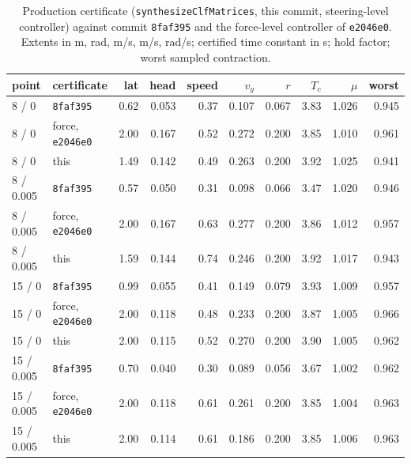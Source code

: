 \documentclass[11pt]{article}
\begin{document}
\begin{table}
\centering\small
\caption{Production certificate (\texttt{synthesizeClfMatrices}, this
commit, steering-level controller) against commit \texttt{8faf395} and the
force-level controller of \texttt{e2046e0}. Extents in m, rad, m/s, m/s,
rad/s; certified time constant in s; hold factor; worst sampled contraction.}
\label{tab:production}
\begin{tabular}{llrrrrrrrr}
\toprule
point & certificate & lat & head & speed & $v_y$ & $r$ & $T_c$ & $\mu$ & worst \\
\midrule
8 / 0 & \texttt{8faf395} & 0.62 & 0.053 & 0.37 & 0.107 & 0.067 & 3.83 & 1.026 & 0.945 \\
8 / 0 & force, \texttt{e2046e0} & 2.00 & 0.167 & 0.52 & 0.272 & 0.200 & 3.85 & 1.010 & 0.961 \\
8 / 0 & this & 1.49 & 0.142 & 0.49 & 0.263 & 0.200 & 3.92 & 1.025 & 0.941 \\
8 / 0.005 & \texttt{8faf395} & 0.57 & 0.050 & 0.31 & 0.098 & 0.066 & 3.47 & 1.020 & 0.946 \\
8 / 0.005 & force, \texttt{e2046e0} & 2.00 & 0.167 & 0.63 & 0.277 & 0.200 & 3.86 & 1.012 & 0.957 \\
8 / 0.005 & this & 1.59 & 0.144 & 0.74 & 0.246 & 0.200 & 3.92 & 1.017 & 0.943 \\
15 / 0 & \texttt{8faf395} & 0.99 & 0.055 & 0.41 & 0.149 & 0.079 & 3.93 & 1.009 & 0.957 \\
15 / 0 & force, \texttt{e2046e0} & 2.00 & 0.118 & 0.48 & 0.233 & 0.200 & 3.87 & 1.005 & 0.966 \\
15 / 0 & this & 2.00 & 0.115 & 0.52 & 0.270 & 0.200 & 3.90 & 1.005 & 0.962 \\
15 / 0.005 & \texttt{8faf395} & 0.70 & 0.040 & 0.30 & 0.089 & 0.056 & 3.67 & 1.002 & 0.962 \\
15 / 0.005 & force, \texttt{e2046e0} & 2.00 & 0.118 & 0.61 & 0.261 & 0.200 & 3.85 & 1.004 & 0.963 \\
15 / 0.005 & this & 2.00 & 0.114 & 0.61 & 0.186 & 0.200 & 3.85 & 1.006 & 0.963 \\
\bottomrule
\end{tabular}
\end{table}
\end{document}
